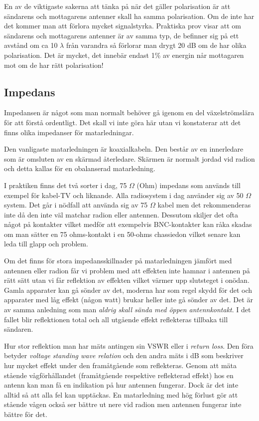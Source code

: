 En av de viktigaste sakerna att tänka på när det gäller polarisation är att sändarens och mottagarens antenner skall ha samma polarisation. Om de inte har det kommer man att förlora mycket signalstyrka. Praktiska prov visar att om sändarens och mottagarens antenner är av samma typ, de befinner sig på ett avstånd om ca 10 $\lambda$ från varandra så förlorar man drygt 20 dB om de har olika polarisation. Det är mycket, det innebär endast 1\% av energin når mottagaren mot om de har rätt polarisation!


\subsection{Impedans}

Impedansen är något som man normalt behöver gå igenom en del växelströmslära för att förstå ordentligt. Det skall vi inte göra här utan vi konstaterar att det finns olika impedanser för matarledningar.

Den vanligaste matarledningen är koaxialkabeln. Den består av en innerledare som är omsluten av en skärmad återledare. Skärmen är normalt jordad vid radion och detta kallas för en obalanserad matarledning. 

I praktiken finns det två sorter i dag, 75 $\Omega$ (Ohm) impedans som används till exempel för kabel-TV och liknande. Alla radiosystem i dag använder sig av 50 $\Omega$ system. Det går i nödfall att använda sig av 75 $\Omega$ kabel men det rekommenderas inte då den inte väl matchar radion eller antennen. Dessutom skiljer det ofta något på kontakter vilket medför att exempelvis BNC-kontakter kan råka skadas om man sätter en 75 ohms-kontakt i en 50-ohms chassiedon vilket senare kan leda till glapp och problem.

Om det finns för stora impedansskillnader på matarledningen jämfört med antennen eller radion får vi problem med att effekten inte hamnar i antennen på rätt sätt utan vi får reflektion av effekten vilket värmer upp slutsteget i onödan. Gamla apparater kan gå sönder av det, moderna har som regel skydd för det och apparater med låg effekt (någon watt) brukar heller inte gå sönder av det. Det är av samma anledning som man \textit{aldrig skall sända med öppen antennkontakt}. I det fallet blir reflektionen total och all utgående effekt reflekteras tillbaka till sändaren. 

Hur stor reflektion man har mäts antingen sin VSWR eller i \textit{return loss}. Den föra betyder \textit{voltage standing wave relation} och den andra mäts i dB som beskriver hur mycket effekt under den framåtgående som reflekteras. Genom att mäta stående vågförhållandet (framåtgående respektive reflekterad effekt) hos en antenn kan man få en indikation på hur antennen fungerar. Dock är det inte alltid så att alla fel kan upptäckas. En matarledning med hög förlust gör att stående vågen också ser bättre ut nere vid radion men antennen fungerar inte bättre för det. 

